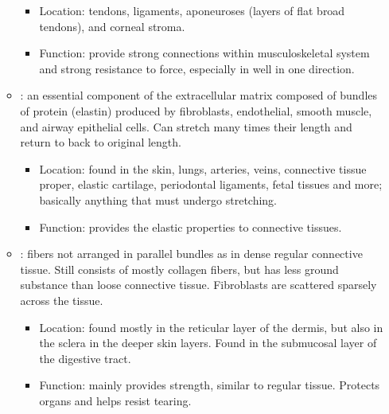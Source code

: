 \begin{itemize}
\begin{itemize}
    \begin{itemize}
      \item Location: tendons, ligaments, aponeuroses (layers of flat broad tendons), and corneal stroma.
      \item Function: provide strong connections within musculoskeletal system and strong resistance to force, especially in well in one direction. 
    \end{itemize}
    \item {}: an essential component of the extracellular matrix composed of bundles of protein (elastin) produced by fibroblasts, endothelial, smooth muscle, and airway epithelial cells. Can stretch many times their length and return to back to original length.
    \begin{itemize}
      \item Location: found in the skin, lungs, arteries, veins, connective tissue proper, elastic cartilage, periodontal ligaments, fetal tissues and more; basically anything that must undergo stretching.
      \item Function: provides the elastic properties to connective tissues.
    \end{itemize}
    \item {}: fibers not arranged in parallel bundles as in dense regular connective tissue. Still consists of mostly collagen fibers, but has less ground substance than loose connective tissue. Fibroblasts are scattered sparsely across the tissue.
    \begin{itemize}
      \item Location: found mostly in the reticular layer of the dermis, but also in the sclera in the deeper skin layers. Found in the submucosal layer of the digestive tract.
      \item Function: mainly provides strength, similar to regular tissue. Protects organs and helps resist tearing. 
    \end{itemize}
  \end{itemize}
  
\end{itemize}

\newpage
